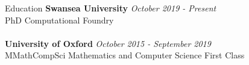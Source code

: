\documentclass{resume} %
\begin{document}

\begin{rSection}{Education}
{\bf Swansea University} \hfill {\em October 2019 - Present} 
\\{PhD} \hfill {Computational Foundry}
\\ \\
{\bf University of Oxford} \hfill {\em October 2015 - September 2019} 
\\{MMathCompSci Mathematics and Computer Science} \hfill {First Class}
\end{rSection}

\end{document}
